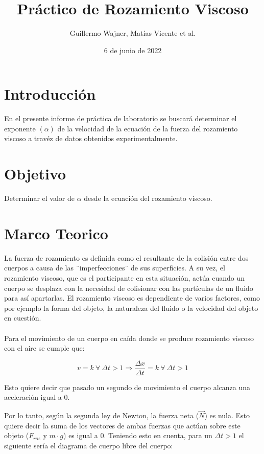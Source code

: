 \documentclass{article}
\title{Práctico de Rozamiento Viscoso}
\author{Guillermo Wajner, Matías Vicente et al.}
\date{6 de junio de 2022}
\begin{document}
\maketitle

\section{Introducción}
En el presente informe de práctica de laboratorio se buscará determinar el exponente $(\alpha)$ de la velocidad de la ecuación de la fuerza del rozamiento viscoso a travéz de datos obtenidos experimentalmente.

\section{Objetivo}

Determinar el valor de $\alpha$ desde la ecuación del rozamiento viscoso. 

\section{Marco Teorico}
La fuerza de rozamiento es definida como el resultante de la colisión entre dos cuerpos a causa de las ¨imperfecciones¨ de sus superficies. A su vez, el rozamiento viscoso, que es el participante en esta situación, actúa cuando un cuerpo se desplaza con la necesidad de colisionar con las partículas de un fluido para así apartarlas. El rozamiento viscoso es dependiente de varios factores, como por ejemplo la forma del objeto, la naturaleza del fluido o la velocidad del objeto en cuestión.
\\
\\
Para el movimiento de un cuerpo en caída donde se produce rozamiento viscoso con el aire se cumple que:

$$v=k \ \forall \ \Delta t>1\Rightarrow \frac{\Delta x}{\Delta t}=k \ \forall \ \Delta t>1$$

Esto quiere decir que pasado un segundo de movimiento el cuerpo alcanza una aceleración igual a 0.

\pagebreak

Por lo tanto, según la segunda ley de  Newton, la fuerza neta ($\vec{N}$) es nula. Esto quiere decir la suma de los vectores de ambas fuerzas que actúan sobre este objeto ($F_{roz}$ y $m\cdot g$) es igual a 0. Teniendo esto en cuenta, para un $\Delta t>1$ el siguiente sería el diagrama de cuerpo libre del cuerpo:

\begin{figure}[H]
\begin{center}
\end{center}
\end{figure}
\end{document}
